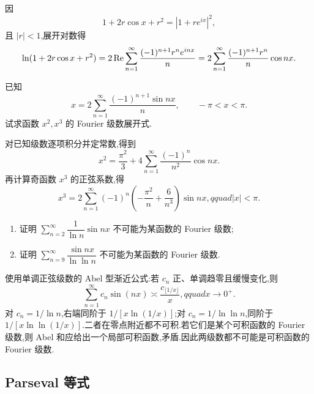 \begin{solution}
    因
    \[
        1+2r\cos x+r^2=|1+re^{ix}|^2,
    \]
    且 $|r|<1$,展开对数得
    \[
        \ln(1+2r\cos x+r^2)
        =2\operatorname{Re}\sum\limits_{n=1}^{\infty}\dfrac{(-1)^{n+1}r^ne^{inx}}n
        =2\sum\limits_{n=1}^{\infty}\dfrac{(-1)^{n+1}r^n}{n}\cos nx.
    \]
\end{solution}

\begin{example}
    已知
    \[
        x=2\sum\limits_{n=1}^{\infty}\dfrac{(-1)^{n+1}\sin nx}{n},
        \qquad -\pi<x<\pi.
    \]
    试求函数 $x^2,x^3$ 的 Fourier 级数展开式.
\end{example}
\exampleblank

\begin{solution}
    对已知级数逐项积分并定常数,得到
    \[
        x^2=\dfrac{\pi^2}{3}+4\sum\limits_{n=1}^{\infty}
        \dfrac{(-1)^n}{n^2}\cos nx.
    \]
    再计算奇函数 $x^3$ 的正弦系数,得
    \[
        x^3=2\sum\limits_{n=1}^{\infty}(-1)^n
        \left(-\dfrac{\pi^2}{n}+\dfrac{6}{n^3}\right)\sin nx,qquad |x|<\pi.
    \]
\end{solution}

\begin{example}
    \begin{enumerate}
        \item 证明 $\displaystyle\sum\limits_{n=2}^{\infty}\dfrac{1}{\ln n}\sin nx$ 不可能为某函数的 Fourier 级数;
        \item 证明 $\displaystyle\sum\limits_{n=9}^{\infty}\dfrac{\sin nx}{\ln\ln n}$ 不可能为某函数的 Fourier 级数.
    \end{enumerate}
\end{example}
\exampleblank

\begin{solution}
    使用单调正弦级数的 Abel 型渐近公式:若 $c_n$ 正、单调趋零且缓慢变化,则
    \[
        \sum\limits_{n=1}^{\infty}c_n\sin(nx)\asymp\dfrac{c_{\lfloor1/x\rfloor}}x,qquad x\to0^+.
    \]
    对 $c_n=1/\ln n$,右端同阶于 $1/[x\ln(1/x)]$;对
    $c_n=1/\ln\ln n$,同阶于 $1/[x\ln\ln(1/x)]$.二者在零点附近都不可积.若它们是某个可积函数的 Fourier 级数,则 Abel 和应给出一个局部可积函数,矛盾.因此两级数都不可能是可积函数的 Fourier 级数.
\end{solution}



\subsection{Parseval 等式}

